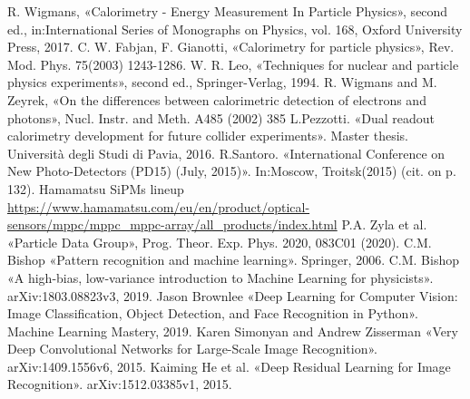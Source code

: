 \documentclass[a4paper,11pt,titlepage,oneside]{book}	%
\begin{document}
	\begin{backmatter}
		
		
		\begin{thebibliography}{99}
			
			
			  R. Wigmans, «Calorimetry - Energy Measurement In Particle Physics», second ed., in:International  Series  of  Monographs  on  Physics,  vol.  168,  Oxford  University  Press, 2017.
			  C.  W.  Fabjan,  F.  Gianotti, «Calorimetry  for  particle  physics»,  Rev.  Mod.  Phys.  75(2003) 1243-1286.
			  W. R. Leo, «Techniques for nuclear and particle physics experiments»,  second ed., Springer-Verlag, 1994.
			 R.  Wigmans  and  M.  Zeyrek, «On  the  differences  between  calorimetric  detection  of electrons and photons», Nucl. Instr. and Meth. A485 (2002) 385
			 L.Pezzotti. «Dual readout calorimetry development for future collider experiments». Master thesis. Università degli Studi di Pavia, 2016.
			 R.Santoro. «International Conference on New Photo-Detectors (PD15) (July, 2015)». In:Moscow, Troitsk(2015) (cit. on p. 132).
			 Hamamatsu SiPMs lineup \url{https://www.hamamatsu.com/eu/en/product/optical-sensors/mppc/mppc_mppc-array/all_products/index.html}
			 P.A. Zyla et al. «Particle Data Group», Prog. Theor. Exp. Phys. 2020, 083C01 (2020). 
			 C.M. Bishop «Pattern recognition and machine learning». Springer, 2006. 
			 C.M. Bishop «A high-bias, low-variance introduction to Machine Learning for physicists». arXiv:1803.08823v3, 2019. 
			 Jason Brownlee «Deep Learning for Computer Vision: Image Classification, Object Detection, and Face Recognition in Python». Machine Learning Mastery, 2019.
			 Karen Simonyan and Andrew Zisserman «Very Deep Convolutional Networks for Large-Scale Image Recognition». arXiv:1409.1556v6, 2015.
			 Kaiming He et al. «Deep Residual Learning for Image Recognition». arXiv:1512.03385v1, 2015.
			
		\end{thebibliography}
		
	\end{backmatter}
	
	
\end{document}
